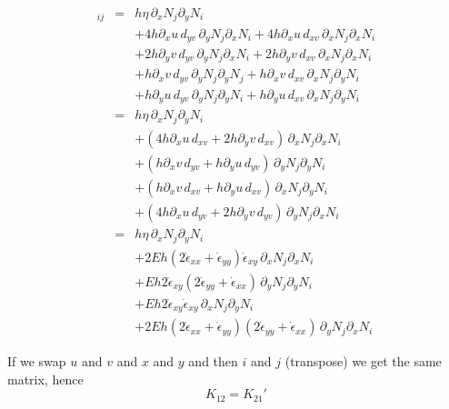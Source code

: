 \documentclass[10pt,a4paper]{book}
\newcommand{\p}{\partial}
\newcommand{\exx}{\dot{\epsilon}_{xx}}
\newcommand{\eyy}{\dot{\epsilon}_{yy}}
\newcommand{\exy}{\dot{\epsilon}_{xy}}
\begin{document}
\begin{eqnarray*}
[K_{12}]_{ij} &=& h \eta \, \p_x N_j \p_y N_i \\
& & + 4 h \p_x u \, d_{yv} \, \p_y N_j \p_x N_i + 4 h \p_x u \, d_{xv} \, \p_x N_j \p_x N_i \\
& & + 2 h \p_y v \, d_{yv} \, \p_y N_j \p_x N_i + 2 h \p_y v \, d_{xv}\, \p_x N_j \p_x N_i \\
& & + h   \p_x v \, d_{yv} \, \p_y N_j \p_y N_j +   h \p_x v \, d_{xv} \, \p_x N_j \p_y N_i \\
& & + h   \p_y u \, d_{yv} \, \p_y N_j \p_y N_i +   h \p_y u \, d_{xv} \, \p_x N_j \p_y N_i\\
&=& h \eta \, \p_x N_j \p_y N_i \\
& & + (4 h \p_x u \, d_{xv} + 2 h \p_y v \, d_{xv}) \, \p_x N_j \p_x N_i \\
& & + (h   \p_x v \, d_{yv} + h   \p_y u \, d_{yv} )\, \p_y N_j \p_y N_i \\
& & +   (h \p_x v \, d_{xv} +   h \p_y u \, d_{xv} )\, \p_x N_j \p_y N_i \\
& & + (4 h \p_x u \, d_{yv} + 2 h \p_y v \, d_{yv}) \, \p_y N_j \p_x N_i \\
&=& h \eta \, \p_x N_j \p_y N_i \\
& & + 2 E h (2  \exx  +  \eyy )  \exy \, \p_x N_j \p_x N_i \\
& & + E h   2 \exy (2 \eyy + \exx) \, \p_y N_j \p_y N_i \\
& & + E h   2 \exy  \exy \, \p_x N_j \p_y N_i \\
& & + 2 E h (2 \exx  + \eyy ) (2 \eyy + \exx ) \, \p_y N_j \p_x N_i 
\end{eqnarray*}

If we swap $u$ and $v$ and $x$ and $y$ and then $i$ and $j$ (transpose) we get the same matrix, hence
\[
K_{12}=K_{21}'
\]
\end{document}
